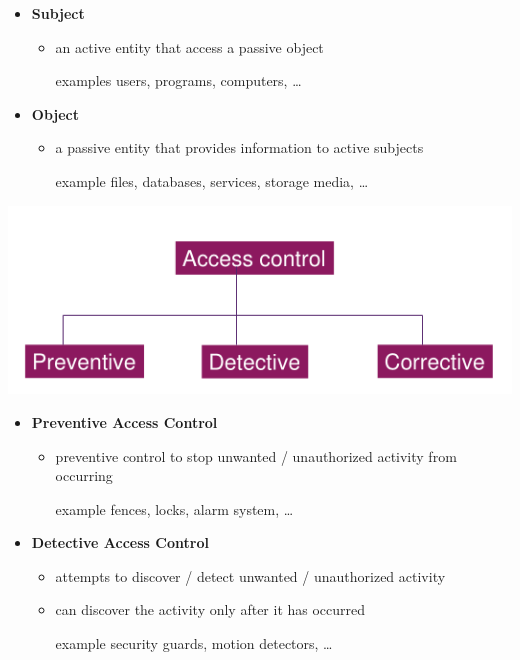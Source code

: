 \documentclass[11pt,twoside,landscape]{article}
\begin{document}
\begin{multicols}{4}
\begin{itemize}
\item \textbf{Subject}
\begin{itemize}
\item an active entity that access a passive object
\item[{examples}] users, programs, computers, \ldots{}
\end{itemize}

\item \textbf{Object}
\begin{itemize}
\item a passive entity that provides information to active subjects
\item[{example}] files, databases, services, storage media, \ldots{}
\end{itemize}
\end{itemize}


\begin{center}
\includegraphics[width=.9\linewidth]{img/primary_access_control_types.png}
\end{center}

\begin{itemize}
\item \textbf{Preventive Access Control}
\begin{itemize}
\item preventive control to stop unwanted / unauthorized activity from occurring
\item[{example}] fences, locks, alarm system, \ldots{}
\end{itemize}

\item \textbf{Detective Access Control}
\begin{itemize}
\item attempts to discover / detect unwanted / unauthorized activity
\item can discover the activity only after it has occurred
\item[{example }] security guards, motion detectors, \ldots{}
\end{itemize}


\end{itemize}
\end{multicols}
\end{document}
